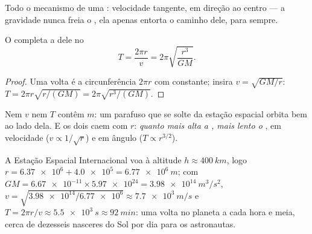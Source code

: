 \begin{omfigure}

{\small Todo o mecanismo de uma : velocidade tangente,  em direção ao
centro --- a gravidade nunca freia o , ela apenas entorta o caminho dele,
para sempre.}
\end{omfigure}

\begin{proposition}\label{prop:g12:satellites-kepler:period}
O  completa a  dele no 
\[ T = \frac{2\pi r}{v} = 2\pi \sqrt{\frac{r^3}{G M}}. \]
\end{proposition}

\begin{proof}
Uma volta é a circunferência $2\pi r$ com  constante; insira
$v = \sqrt{GM/r}$: $T = 2\pi r\sqrt{r/(GM)} = 2\pi\sqrt{r^3/(GM)}$.
\end{proof}

Nem $v$ nem $T$ contêm $m$: um parafuso que se solte da estação espacial orbita
bem ao lado dela. E os dois caem com $r$: \emph{quanto mais alta a , mais lento
o }, em velocidade ($v \propto 1/\sqrt r$) e em ângulo
($T \propto r^{3/2}$).

\begin{example}\label{ex:g12:satellites-kepler:iss}
A Estação Espacial Internacional voa à altitude $h \approx \qty{400}{km}$, logo
$r = \num{6.37e6} + \num{4.0e5} = \qty{6.77e6}{m}$; com
$GM = \num{6.67e-11} \times \num{5.97e24} = \qty{3.98e14}{m^3/s^2}$,
$v = \sqrt{\num{3.98e14}/\num{6.77e6}} \approx \qty{7.7e3}{m/s}$ e
$T = 2\pi r/v \approx \qty{5.5e3}{s} \approx \qty{92}{min}$: uma volta no planeta a
cada hora e meia, cerca de dezesseis nasceres do Sol por dia para os astronautas.
\end{example}

